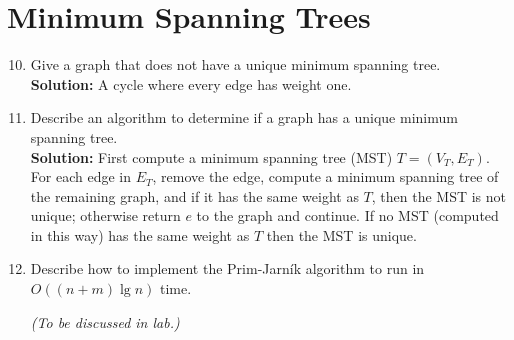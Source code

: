 \documentclass[letterpaper,11pt]{article}
\begin{document}
\section{Minimum Spanning Trees}
\begin{enumerate}
\setcounter{enumi}{9}
\item Give a graph that does not have a unique minimum spanning tree.\\

\textbf{Solution:} A cycle where every edge has weight one.

\item Describe an algorithm to determine if a graph has a unique minimum spanning tree.\\

\textbf{Solution:} First compute a minimum spanning tree (MST) $T = (V_T,E_T)$. For each edge in $E_T$, remove the edge, compute a minimum spanning tree of the remaining graph, and if it has the same weight as $T$, then the MST is not unique; otherwise return $e$ to the graph and continue. If no MST (computed in this way) has the same weight as $T$ then the MST is unique.

\item Describe how to implement the Prim-Jarn\'ik algorithm to run in $O((n + m)\lg n)$ time.

\emph{(To be discussed in lab.)}
\end{enumerate}
\end{document}
